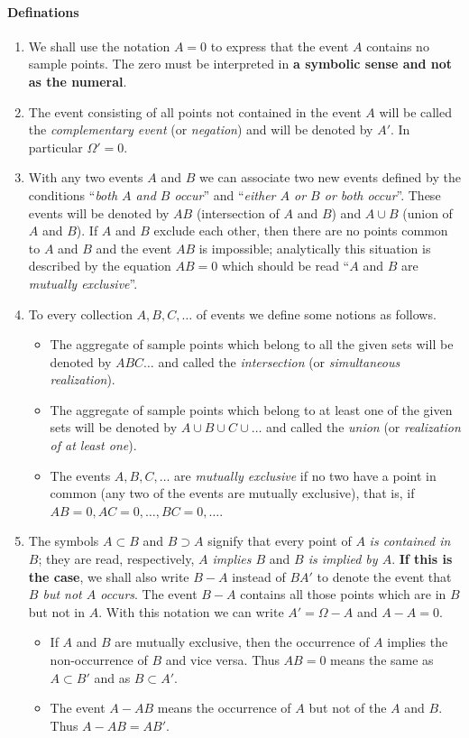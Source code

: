\documentclass{article}
\numberwithin{equation}{subsection}
\begin{document}
			\paragraph{Definations} 
				\begin{enumerate}
				\item We shall use the notation $A=0$ to express that the event $A$ contains no sample points. The zero must be interpreted in \textbf{a symbolic sense and not as the numeral}.
				\item The event consisting of all points not contained in the event $A$ will be called the \textit{complementary event }(or \textit{negation}) and will be denoted by $A'$. In particular $\Omega ' = 0$.
				\item With any two events $A$ and $B$ we can associate two new events defined by the conditions ``\textit{both $A$ and $B$ occur}'' and ``\textit{either $A$ or $B$ or both occur}''. These events will be denoted by $AB$ (intersection of $A$ and $B$) and $A\cup B$ (union of $A$ and $B$). If $A$ and $B$ exclude each other, then there are no points common to $A$ and $B$ and the event $AB$ is impossible; analytically this situation is described by the equation $AB=0$ which should be read ``$A$ and $B$ are \textit{mutually exclusive}''.
				\item To every collection $A,B,C,\dots$ of events we define some notions as  follows.
					\begin{itemize}
					\item The aggregate of sample points which belong to all the given sets will be denoted by $ABC\dots$ and called the \textit{intersection} (or \textit{simultaneous realization}).
					\item The aggregate of sample points which belong to at least one of the given sets will be denoted by $A\cup B\cup C\cup \dots$ and called the \textit{union} (or \textit{realization of at least one}).
					\item The events $A,B,C,\dots$ are \textit{mutually exclusive} if no two have a point in common (any two of the events are mutually exclusive), that is, if $AB=0, AC=0, \dots, BC=0, \dots$.
					\end{itemize}
				\item The symbols $A\subset B$ and $B\supset A$ signify that every point of $A$ \textit{is contained in} $B$; they are read, respectively, \textit{$A$ implies $B$} and \textit{$B$ is implied by $A$}. \textbf{If this is the case}, we shall also write $B-A$ instead of $BA'$ to denote the event that \textit{$B$ but not $A$ occurs}. The event $B-A$ contains all those points which are in $B$ but not in $A$. With this notation we can write $A'=\Omega-A$ and $A-A=0$.
					\begin{itemize}
					\item If $A$ and $B$ are mutually exclusive, then the occurrence of $A$ implies the non-occurrence of $B$ and vice versa. Thus $AB=0$ means the same as $A\subset B'$ and as $B\subset A'$.
					\item The event $A-AB$ means the occurrence of $A$ but not of the $A$ and $B$. Thus $A-AB=AB'$.
					\end{itemize}
				\end{enumerate} 
\end{document}

